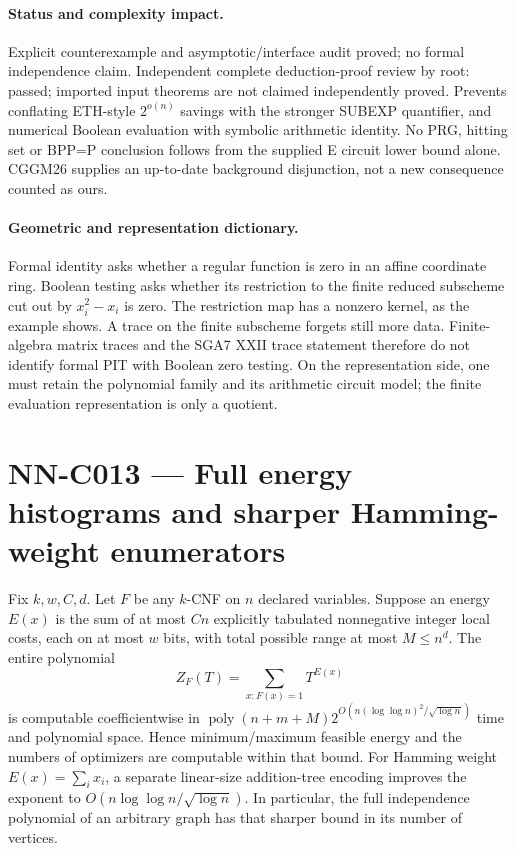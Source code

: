 \paragraph{Status and complexity impact.}
Explicit counterexample and asymptotic/interface audit proved; no formal independence claim. Independent complete deduction-proof review by root: passed; imported input theorems are not claimed independently proved. Prevents conflating ETH-style $2^{o(n)}$ savings with the stronger SUBEXP quantifier, and numerical Boolean evaluation with symbolic arithmetic identity. No PRG, hitting set or BPP=P conclusion follows from the supplied E circuit lower bound alone. CGGM26 supplies an up-to-date background disjunction, not a new consequence counted as ours.

\paragraph{Geometric and representation dictionary.}
Formal identity asks whether a regular function is zero in an affine coordinate ring. Boolean testing asks whether its restriction to the finite reduced subscheme cut out by $x_i^2-x_i$ is zero. The restriction map has a nonzero kernel, as the example shows. A trace on the finite subscheme forgets still more data. Finite-algebra matrix traces and the SGA7 XXII trace statement therefore do not identify formal PIT with Boolean zero testing. On the representation side, one must retain the polynomial family and its arithmetic circuit model; the finite evaluation representation is only a quotient.



\section{NN-C013 --- Full energy histograms and sharper Hamming-weight enumerators}
\begin{proposition}[NN-C013]
Fix $k,w,C,d$. Let $F$ be any $k$-CNF on $n$ declared variables. Suppose an energy $E(x)$ is the sum of at most $Cn$ explicitly tabulated nonnegative integer local costs, each on at most $w$ bits, with total possible range at most $M\leq n^d$. The entire polynomial
\[
 Z_F(T)=\sum_{x:F(x)=1}T^{E(x)}
\]
is computable coefficientwise in $\operatorname{poly}(n+m+M)2^{O(n(\log\log n)^2/\sqrt{\log n})}$ time and polynomial space. Hence minimum/maximum feasible energy and the numbers of optimizers are computable within that bound. For Hamming weight $E(x)=\sum_i x_i$, a separate linear-size addition-tree encoding improves the exponent to $O(n\log\log n/\sqrt{\log n})$. In particular, the full independence polynomial of an arbitrary graph has that sharper bound in its number of vertices.
\end{proposition}
